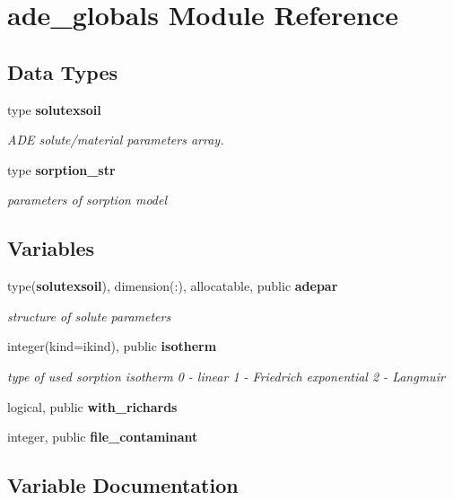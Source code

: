 \section{ade\+\_\+globals Module Reference}
\label{namespaceade__globals}
\subsection*{Data Types}
\begin{DoxyCompactItemize}
\item 
type {\bf solutexsoil}
\begin{DoxyCompactList}\small\item\em A\+DE solute/material parameters array. \end{DoxyCompactList}\item 
type {\bf sorption\+\_\+str}
\begin{DoxyCompactList}\small\item\em parameters of sorption model \end{DoxyCompactList}\end{DoxyCompactItemize}
\subsection*{Variables}
\begin{DoxyCompactItemize}
\item 
type({\bf solutexsoil}), dimension(\+:), allocatable, public {\bf adepar}
\begin{DoxyCompactList}\small\item\em structure of solute parameters \end{DoxyCompactList}\item 
integer(kind=ikind), public {\bf isotherm}
\begin{DoxyCompactList}\small\item\em type of used sorption isotherm 0 -\/ linear 1 -\/ Friedrich exponential 2 -\/ Langmuir \end{DoxyCompactList}\item 
logical, public {\bf with\+\_\+richards}
\item 
integer, public {\bf file\+\_\+contaminant}
\end{DoxyCompactItemize}


\subsection{Variable Documentation}
